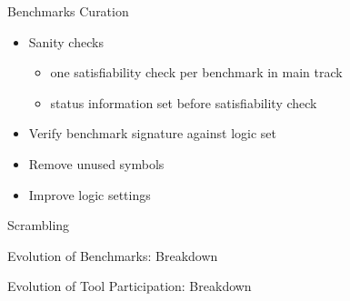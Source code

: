 \documentclass{beamer}
\begin{document}

\begin{frame}{Benchmarks Curation}

\begin{itemize}

\item Sanity checks

\begin{itemize}

\item one satisfiability check per benchmark in main track

\item status information set before satisfiability check

\end{itemize}

\item Verify benchmark signature against logic set

\item Remove unused symbols

\item Improve logic settings

\end{itemize}

\end{frame}


\begin{frame}{Scrambling}

\end{frame}



\begin{frame}{Evolution of Benchmarks: Breakdown}

\end{frame}


\begin{frame}{Evolution of Tool Participation: Breakdown}

\end{frame}
\end{document}

